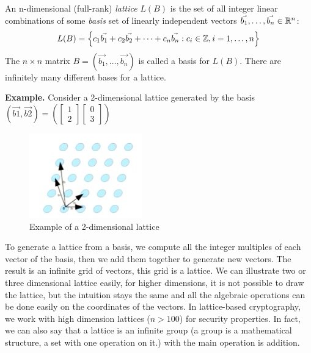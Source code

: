 \begin{definition}[Lattice]
  An n-dimensional (full-rank) \emph{lattice} $L(B)$ is the set of all integer
  linear combinations of some \emph{basis} set of linearly independent vectors
  $\vec{b_1},\dots,\vec{b_n} \in \mathbb{R}^n$:
  \[
    L(B) = \left\{ c_1 \vec{b_1} + c_2 \vec{b_2} + \dots + c_n \vec{b_n} : c_i
      \in \mathbb{Z}, i = 1, \dots, n \right\}
  \]
  The $ n \times n$ matrix $B = (\vec{b_1},\dots, \vec{b_n})$ is called a basis
  for $L(B)$. There are infinitely many different bases for a lattice.
\end{definition}

\textbf{Example.} Consider a 2-dimensional lattice generated by the basis
$(\vec{b1}, \vec{b2}) = \left( \begin{bmatrix} 1 \\ 2
  \end{bmatrix} \begin{bmatrix} 0 \\ 3
  \end{bmatrix}\right)$
\begin{figure}[h]
  \centering \includegraphics{lattices}
  \caption{Example of a 2-dimensional lattice}
  \label{fig:2dimLattice}
\end{figure}
To generate a lattice from a basis, we compute all the integer multiples of
each vector of the basis, then we add them together to generate new vectors. The
result is an infinite grid of vectors, this grid is a lattice. We can illustrate
two or three dimensional lattice easily, for higher dimensions, it is not
possible to draw the lattice, but the intuition stays the same and all the
algebraic operations can be done easily on the coordinates of the vectors. In
lattice-based cryptography, we work with high dimension lattices ($n > 100$) for
security properties. In fact, we can also say that a lattice is an infinite
group (a group is a mathematical structure, a set with one operation on it.)
with the main operation is addition.

